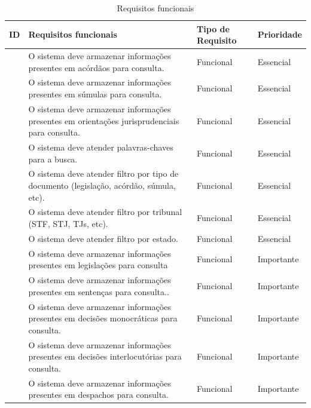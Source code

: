 \documentclass[
	12pt,				%
	openright,			%
	oneside,			    %
	a4paper,				%
	english,			%
	french,			%
	spanish,			%
	brazil			%
	]{abntex2}
\begin{document}
\begin{table}[htb]
\ABNTEXfontereduzida
\caption[Requisitos funcionais]{Requisitos funcionais}
\label{tab-nivinv}
\hspace*{-1.4cm}
\begin{tabular}{|>{\centering\arraybackslash}m{1.2cm}|>{\centering\arraybackslash}m{10cm}|>{\centering\arraybackslash}m{2.25cm}|>{\centering\arraybackslash}m{2.2cm}|}
  \hline
   \textbf{ID} & \textbf{Requisitos funcionais}  & \textbf{Tipo de Requisito}  & \textbf{Prioridade}  \\
    \hline
    [RF01]& O sistema deve armazenar informações presentes em acórdãos para consulta.  & Funcional &
    Essencial  \\
    \hline
    [RF02] & O sistema deve armazenar informações presentes em súmulas para consulta. & Funcional  & Essencial \\
    \hline
    [RF03] & O sistema deve armazenar informações presentes em orientações jurisprudenciais para consulta. & Funcional & Essencial \\
    \hline
    [RF04] & O sistema deve atender palavras-chaves para a busca. & Funcional & Essencial \\
    \hline
    [RF05] & O sistema deve atender filtro por tipo de documento (legislação, acórdão, súmula, etc). & Funcional & Essencial \\
    \hline
    [RF06] & O sistema deve atender filtro por tribunal (STF, STJ, TJs, etc). & Funcional & Essencial \\
    \hline
    [RF07] & O sistema deve atender filtro por estado. & Funcional & Essencial \\
    \hline
    [RF08] & O sistema deve armazenar informações presentes em legislações para consulta & Funcional & Importante \\
    \hline
    [RF09] & O sistema deve armazenar informações presentes em sentenças para consulta.. & Funcional & Importante \\
    \hline
    [RF10] & O sistema deve armazenar informações presentes em decisões monocráticas para consulta. & Funcional & Importante \\
    \hline
    [RF11] & O sistema deve armazenar informações presentes em decisões interlocutórias para consulta. & Funcional & Importante \\
    \hline
    [RF12] & O sistema deve armazenar informações presentes em despachos para consulta. & Funcional & Importante \\

\end{tabular}
\end{table}
\end{document}
